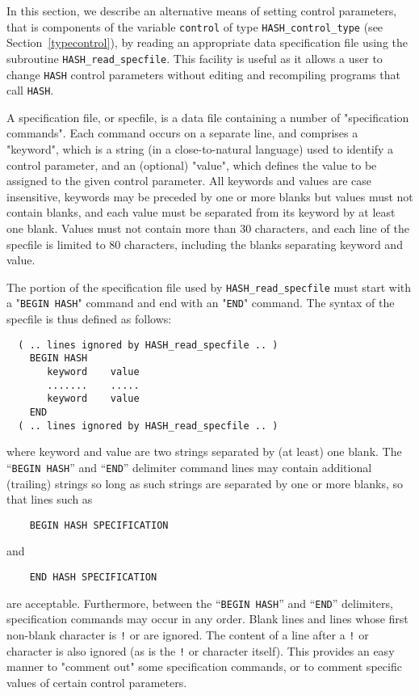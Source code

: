 \documentclass{galahad}
\newcommand{\packagename}{HASH}
\begin{document}

\galfeatures
\noindent In this section, we describe an alternative means of setting
control parameters, that is components of the variable {\tt control} of type
{\tt \packagename\_control\_type}
(see Section~\ref{typecontrol}),
by reading an appropriate data specification file using the
subroutine {\tt \packagename\_read\_specfile}. This facility
is useful as it allows a user to change  {\tt \packagename} control parameters
without editing and recompiling programs that call {\tt \packagename}.

A specification file, or specfile, is a data file containing a number of
"specification commands". Each command occurs on a separate line,
and comprises a "keyword",
which is a string (in a close-to-natural language) used to identify a
control parameter, and
an (optional) "value", which defines the value to be assigned to the given
control parameter. All keywords and values are case insensitive,
keywords may be preceded by one or more blanks but
values must not contain blanks, and
each value must be separated from its keyword by at least one blank.
Values must not contain more than 30 characters, and
each line of the specfile is limited to 80 characters,
including the blanks separating keyword and value.

The portion of the specification file used by
{\tt \packagename\_read\_specfile}
must start
with a "{\tt BEGIN \packagename}" command and end with an
"{\tt END}" command.  The syntax of the specfile is thus defined as follows:
\begin{verbatim}
  ( .. lines ignored by HASH_read_specfile .. )
    BEGIN HASH
       keyword    value
       .......    .....
       keyword    value
    END
  ( .. lines ignored by HASH_read_specfile .. )
\end{verbatim}
where keyword and value are two strings separated by (at least) one blank.
The ``{\tt BEGIN \packagename}'' and ``{\tt END}'' delimiter command lines
may contain additional (trailing) strings so long as such strings are
separated by one or more blanks, so that lines such as
\begin{verbatim}
    BEGIN HASH SPECIFICATION
\end{verbatim}
and
\begin{verbatim}
    END HASH SPECIFICATION
\end{verbatim}
are acceptable. Furthermore,
between the
``{\tt BEGIN \packagename}'' and ``{\tt END}'' delimiters,
specification commands may occur in any order.  Blank lines and
lines whose first non-blank character is {\tt !} or {\tt *} are ignored.
The content
of a line after a {\tt !} or {\tt *} character is also
ignored (as is the {\tt !} or {\tt *}
character itself). This provides an easy manner to "comment out" some
specification commands, or to comment specific values
of certain control parameters.
\end{document}
